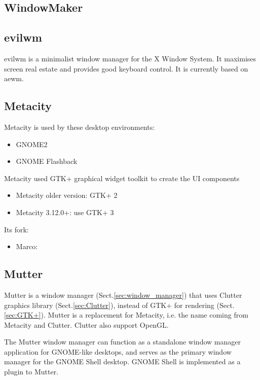 \subsection{WindowMaker}
\label{sec:WindowMaker}

\subsection{evilwm}

evilwm is a minimalist window manager for the X Window System. It maximises
screen real estate and provides good keyboard control. It is currently based on
aewm. 

\subsection{Metacity}
\label{sec:Metacity}

Metacity is used by these desktop environments:
\begin{itemize}
  \item GNOME2
  \item GNOME Flashback
\end{itemize} 

Metacity used GTK+ graphical widget toolkit to create the UI components
\begin{itemize}
  \item Metacity older version: GTK+ 2
  \item Metacity 3.12.0+: use GTK+ 3
\end{itemize}

Its fork:
\begin{itemize}
  \item Marco: 
\end{itemize}

\subsection{Mutter}
\label{sec:Mutter}

Mutter is a window manager (Sect.\ref{sec:window_manager}) that uses Clutter
graphics library (Sect.\ref{sec:Clutter}), instead of GTK+ for
rendering (Sect.\ref{sec:GTK+}). Mutter is a replacement for Metacity, i.e. the
name coming from Metacity and Clutter. Clutter also support OpenGL.

The Mutter window manager can function as a standalone window manager
application for GNOME-like desktops, and serves as the primary window manager
for the GNOME Shell desktop. GNOME Shell is implemented as a plugin to Mutter.


